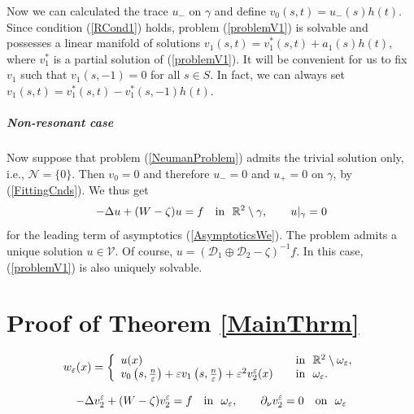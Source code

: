 \documentclass[graybox]{svmult}
\newcommand{\Real}{\mathbb R}
\newcommand{\eps}{\varepsilon}
\newcommand\nep{\textstyle\frac n\eps}
\newcommand{\eqref}[1]{(\ref{#1})}
\begin{document}
Now we can calculated the trace $u_-$ on $\gamma$ and  define $v_0(s,t)=u_-(s)h(t)$. Since  condition \eqref{RCond1} holds, 
problem \eqref{problemV1} is solvable and possesses a linear manifold of
solutions $v_1(s,t)=v_1^*(s,t)+a_1(s)h(t)$, where $v_1^*$ is a partial solution of \eqref{problemV1}. It will be convenient for us to fix $v_1$ such that $v_1(s,-1)=0$ for all $s\in S$. In fact, we can always set  $v_1(s,t)=v_1^*(s,t)-v_1^*(s,-1)h(t)$.







\subparagraph{Non-resonant case}
Now suppose that problem \eqref{NeumanProblem} admits the trivial solution only, i.e.,  $\mathcal{N}=\{0\}$.  Then $v_0=0$ and therefore $u_-=0$ and $u_+=0$ on $\gamma$, by \eqref{FittingCnds}. We thus get
$$
-\Delta u+(W-\zeta)u=f \quad \hbox{in \ } \Real^2\setminus \gamma,\qquad
 u|_{\gamma}=0
$$
for the leading term of asymptotics \eqref{AsymptoticsWe}.
The problem admits a unique solution $u\in \mathcal{V}$. Of course,
$u=(\mathcal{D}_1\oplus\mathcal{D}_2-\zeta)^{-1}f$.
In this case, \eqref{problemV1} is also uniquely solvable.









\section{Proof of Theorem \ref{MainThrm}}
\label{Sec:Proof}

\begin{equation}\label{ApproxWe}
w_\eps(x)=
\left\{
  \begin{array}{ll}
    u(x)&\quad \hbox{in \ }\Real^2\setminus \omega_\eps, \\
    v_0\left(s,\nep\right)+\eps v_1\left(s,\nep\right)+\eps^2 v_2^\eps(x)
&\quad \hbox{in \ } \omega_\eps.
  \end{array}
\right.
\end{equation}

\begin{equation}
 -\Delta v_2^\eps +(W-\zeta) v_2^\eps= f\quad \hbox{in \ } \omega_\eps, \qquad \partial_\nu v_2^\eps=0\quad \hbox{on \ } \omega_\eps
\end{equation}
\end{document}
